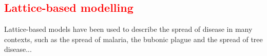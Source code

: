 


%
\subsection{\textcolor{red}{Lattice-based modelling}}
Lattice-based models have been used to describe the spread of disease in many contexts, such as the spread of malaria, the bubonic plague and the spread of tree disease...


